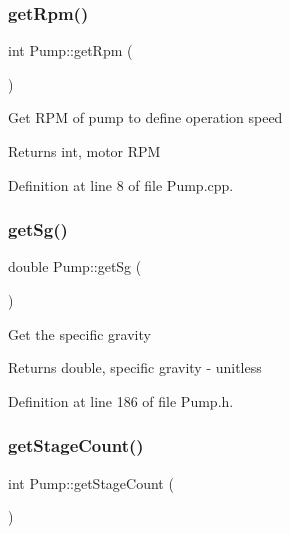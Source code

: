 \subsubsection{\texorpdfstring{get\+Rpm()}{getRpm()}}
{\footnotesize\ttfamily int Pump\+::get\+Rpm (\begin{DoxyParamCaption}{ }\end{DoxyParamCaption})}

Get R\+PM of pump to define operation speed

\begin{DoxyReturn}{Returns}
int, motor R\+PM 
\end{DoxyReturn}


Definition at line 8 of file Pump.\+cpp.

\mbox{\label{class_pump_ae30109b8533176cc1c7c80cf9df95631}} 
\subsubsection{\texorpdfstring{get\+Sg()}{getSg()}}
{\footnotesize\ttfamily double Pump\+::get\+Sg (\begin{DoxyParamCaption}{ }\end{DoxyParamCaption})\hspace{0.3cm}{\ttfamily [inline]}}

Get the specific gravity

\begin{DoxyReturn}{Returns}
double, specific gravity -\/ unitless 
\end{DoxyReturn}


Definition at line 186 of file Pump.\+h.

\mbox{\label{class_pump_a2a8754f53b289dc41f3220adc4eb56e1}} 
\subsubsection{\texorpdfstring{get\+Stage\+Count()}{getStageCount()}}
{\footnotesize\ttfamily int Pump\+::get\+Stage\+Count (\begin{DoxyParamCaption}{ }\end{DoxyParamCaption})\hspace{0.3cm}{\ttfamily [inline]}}

